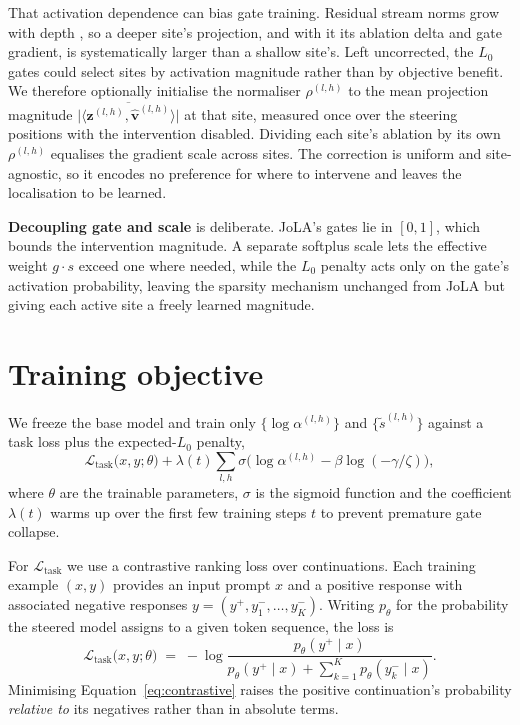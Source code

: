 \documentclass[logo,msc,notimes]{infthesis}
\begin{document}
That activation dependence can bias gate training. Residual stream norms grow with
depth \citep{heimersheim2023residualnorms}, so a deeper site's projection, and with it its ablation delta and gate gradient, is
systematically larger than a shallow site's. Left uncorrected, the $L_0$ gates could select sites by
activation magnitude rather than by objective benefit. We therefore optionally initialise the
normaliser $\rho^{(l,h)}$ to the mean projection magnitude
$\overline{\lvert\langle \mathbf{z}^{(l,h)}, \hat{\mathbf{v}}^{(l,h)}\rangle\rvert}$ at that site,
measured once over the steering positions with the intervention disabled. Dividing each site's
ablation by its own $\rho^{(l,h)}$ equalises the gradient scale across sites. The correction is
uniform and site-agnostic, so it encodes no preference for where to intervene and leaves the
localisation to be learned.

\textbf{Decoupling gate and scale} is deliberate. JoLA's gates lie in $[0,1]$, which bounds the
intervention magnitude. A separate softplus scale lets the effective weight $g\cdot s$ exceed one
where needed, while the $L_0$ penalty acts only on the gate's activation probability, leaving the
sparsity mechanism unchanged from JoLA but giving each active site a freely learned magnitude.

\section{Training objective}\label{sec:objective}

We freeze the base model and train only $\{\log\alpha^{(l,h)}\}$ and $\{\tilde s^{(l,h)}\}$ against
a task loss plus the expected-$L_0$ penalty,
\begin{equation}
\mathcal{L}_{\text{task}}\big(x,y;\theta\big)
    + \lambda(t) \sum_{l,h} \sigma\big(\log\alpha^{(l,h)} - \beta\log(-\gamma/\zeta)\big),
\end{equation}
where $\theta$ are the trainable parameters, $\sigma$ is the sigmoid function and the coefficient $\lambda(t)$ warms up over the first few training steps $t$ to prevent premature gate collapse.

For $\mathcal{L}_{\text{task}}$ we use a contrastive ranking loss over continuations. Each training
example $(x, y)$ provides an input prompt $x$ and a positive response with associated negative responses $y=(y^{+}, y^{-}_1,\dots,y^{-}_K)$. Writing $p_\theta$ for the probability the steered model
assigns to a given token sequence, the loss is   
\begin{equation}\label{eq:contrastive}
\mathcal{L}_{\text{task}}\big(x,y;\theta\big)
    \;=\; -\log \frac{p_\theta(y^{+} \mid {x})}
                     {p_\theta(y^{+} \mid {x}) + \sum_{k=1}^{K} p_\theta(y^{-}_k \mid {x})}.
\end{equation}
Minimising Equation~\ref{eq:contrastive} raises the positive continuation's probability \emph{relative
to} its negatives rather than in absolute terms.
\end{document}
